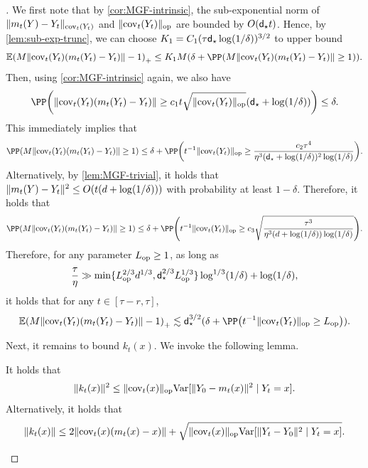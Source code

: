 \begin{proof}[]
We first note that by \cref{cor:MGF-intrinsic}, the sub-exponential norm of $\lVert m_t(Y)-Y_t\rVert_{\mathrm{cov}_t(Y_t)}$ and $\lVert\mathrm{cov}_t(Y_t)\|_{\mathrm{op}}$ are bounded by $O(\mathsf{d}_\star t)$. Hence, by \cref{lem:sub-exp-trunc}, we can choose $K_1=C_1(\tau\mathsf{d}_\star\log(1/\delta))^{3/2}$ to  upper bound 
\begin{align*}
    \En\prn*{M \nrm{\cov_t(Y_t)(m_t(Y_t)-Y_t)}-1 }_+
    \leq K_1M(\delta+\PP\prn*{M \nrm{\cov_t(Y_t)(m_t(Y_t)-Y_t)}\geq 1}).
\end{align*}
Then, using \cref{cor:MGF-intrinsic} again, we also have
\begin{align*}
    \PP\prn*{ \nrm{\cov_t(Y_t)(m_t(Y_t)-Y_t)}\geq c_1t\sqrt{\nrmop{\cov_t(Y_t)}}(\dstar+\log(1/\delta)) }\leq \delta.
\end{align*}
This immediately implies that
\begin{align*}
    \PP\prn*{M \nrm{\cov_t(Y_t)(m_t(Y_t)-Y_t)}\geq 1}
    \leq \delta+\PP\prn*{ t^{-1}\nrmop{\cov_t(Y_t)}\geq \frac{c_2\tau^4}{\eta^3(\dstar+\log(1/\delta))^2\log(1/\delta)} }.
\end{align*}
Alternatively, by \cref{lem:MGF-trivial}, it holds that $\lVert m_t(Y)-Y_t\rVert^2\leq O(t(d+\log(1/\delta)))$ with probability at least $1-\delta$. Therefore, it holds that
\begin{align}\label{pfeq:cov-inner}
    \PP\prn*{M \nrm{\cov_t(Y_t)(m_t(Y_t)-Y_t)}\geq 1}
    \leq \delta+\PP\prn*{ t^{-1}\nrmop{\cov_t(Y_t)}\geq c_3\sqrt{\frac{\tau^3}{\eta^3(d+\log(1/\delta))\log(1/\delta)}} }.
\end{align}
Therefore, for any parameter $L_{\rm op}\geq 1$, as long as 
\begin{align}\label{pfeq:coverage-eta}
    \frac{\tau}{\eta}\gg \min\{ L_{\rm op}^{2/3}d^{1/3}, \mathsf{d}_\star^{2/3}L_{\rm op}^{1/3} \} \log^{1/3}(1/\delta)+\log(1/\delta),
\end{align}
it holds that for any $t\in[\tau-r,\tau]$,
\begin{align*}
    \En\prn*{M \nrm{\cov_t(Y_t)(m_t(Y_t)-Y_t)}-1 }_+\leqsim \dstar^{3/2}(\delta+\PP\prn*{ t^{-1}\nrmop{\cov_t(Y_t)}\geq \Lop}).
\end{align*}

Next, it remains to bound $k_t(x)$. We invoke the following lemma.
\begin{lemma}\label{lem:kt-to-variance}
    It holds that
\begin{align*}
    \lVert k_t(x)\rVert^2
    \leq \lVert\mathrm{cov}_t(x)\|_{\mathrm{op}} \mathrm{Var}[ \lVert Y_0-m_t(x)\rVert^2 \mid Y_t=x ].
\end{align*}
Alternatively, it holds that
\begin{align*}
    \lVert k_t(x)\rVert
    \leq 2\lVert\mathrm{cov}_t(x)(m_t(x)-x)\rVert+\sqrt{\lVert\mathrm{cov}_t(x)\|_{\mathrm{op}} \mathrm{Var}[ \lVert Y_t-Y_0\rVert^2 \mid Y_t=x ]}.
\end{align*}
\end{lemma}


\end{proof}
